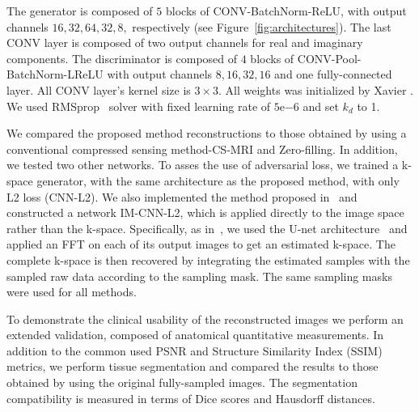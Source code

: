 \documentclass[review]{elsarticle}
\begin{document}
The generator is composed of $5$ blocks of CONV-BatchNorm-ReLU, with output channels $16,32,64,32,8,$ respectively (see Figure~\ref{fig:architectures}). The last CONV layer is composed of two output channels for real and imaginary components. The discriminator is composed of $4$ blocks of CONV-Pool-BatchNorm-LReLU with output channels $8,16,32,16$ and one fully-connected layer. All CONV layer's kernel size is $3\times3$. All weights was initialized by Xavier \cite{glorot2010understanding}. We used RMSprop~\cite{tieleman2012lecture} solver with fixed learning rate of $5\mathrm{e}{-6}$ and set $k_{d}$ to 1.

We compared the proposed method reconstructions to those obtained by using a conventional compressed sensing method-CS-MRI \cite{lustig2007sparse} and Zero-filling. In addition, we tested two other networks. To asses the use of adversarial loss, we trained a k-space generator, with the same architecture as the proposed method, with only L2 loss (CNN-L2). We also implemented the method proposed in~\cite{hyun2017deep} and constructed a network IM-CNN-L2, which is applied directly to the image space rather than the k-space. Specifically, as in~\cite{hyun2017deep}, we used the U-net architecture~\cite{ronneberger2015u} and applied an FFT on each of its output images to get an estimated k-space. The complete k-space is then recovered by integrating the estimated samples with the sampled raw data according to the sampling mask. The same sampling masks were used for all methods.

To demonstrate the clinical usability of the reconstructed images we perform an extended validation, composed of anatomical quantitative measurements. In addition to the common used PSNR and Structure Similarity Index (SSIM)~\cite{wang2004image} metrics, we perform tissue segmentation and compared the results to those obtained by using the original fully-sampled images. The segmentation compatibility is measured in terms of Dice scores and Hausdorff distances.
\end{document}
